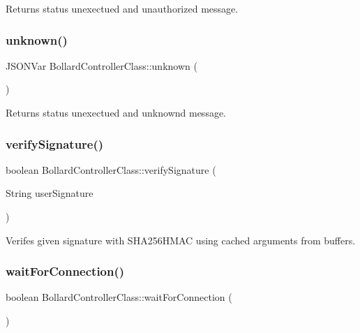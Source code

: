Returns status unexectued and unauthorized message. \mbox{\label{class_bollard_controller_class_a5d086d123a1f4130e9d48fb03105796d}} 
\subsubsection{\texorpdfstring{unknown()}{unknown()}}
{\footnotesize\ttfamily J\+S\+O\+N\+Var Bollard\+Controller\+Class\+::unknown (\begin{DoxyParamCaption}{ }\end{DoxyParamCaption})\hspace{0.3cm}{\ttfamily [private]}}

Returns status unexectued and unknownd message. \mbox{\label{class_bollard_controller_class_ab543ba0b273413dfa896902e6a9855ee}} 
\subsubsection{\texorpdfstring{verify\+Signature()}{verifySignature()}}
{\footnotesize\ttfamily boolean Bollard\+Controller\+Class\+::verify\+Signature (\begin{DoxyParamCaption}\item[{String}]{user\+Signature }\end{DoxyParamCaption})\hspace{0.3cm}{\ttfamily [private]}}

Verifes given signature with S\+H\+A256\+H\+M\+AC using cached arguments from buffers. \mbox{\label{class_bollard_controller_class_a6bc962c69934d16bab48b2407ef6f94a}} 
\subsubsection{\texorpdfstring{wait\+For\+Connection()}{waitForConnection()}}
{\footnotesize\ttfamily boolean Bollard\+Controller\+Class\+::wait\+For\+Connection (\begin{DoxyParamCaption}{ }\end{DoxyParamCaption})}

